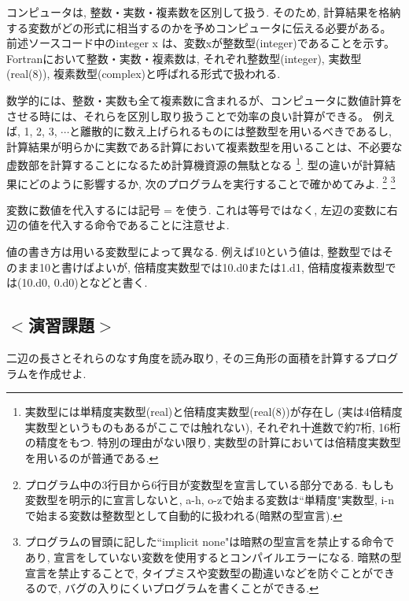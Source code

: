 \documentclass[a4j]{jsbook}
\begin{document}
コンピュータは, 整数・実数・複素数を区別して扱う.
そのため, 計算結果を格納する変数がどの形式に相当するのかを予めコンピュータに伝える必要がある。
前述ソースコード中の{\ttfamily integer x} は、変数{\ttfamily x}が整数型(integer)であることを示す。
Fortranにおいて整数・実数・複素数は, それぞれ整数型(integer), 実数型(real(8)), 複素数型(complex)と呼ばれる形式で扱われる.

数学的には、整数・実数も全て複素数に含まれるが、コンピュータに数値計算をさせる時には、それらを区別し取り扱うことで効率の良い計算ができる。
例えば, 1, 2, 3, $\cdots$と離散的に数え上げられるものには整数型を用いるべきであるし,
計算結果が明らかに実数である計算において複素数型を用いることは、不必要な虚数部を計算することになるため計算機資源の無駄となる
\footnote{実数型には単精度実数型(real)と倍精度実数型(real(8))が存在し
(実は4倍精度実数型というものもあるがここでは触れない),
それぞれ十進数で約7桁, 16桁の精度をもつ.
特別の理由がない限り, 実数型の計算においては倍精度実数型を用いるのが普通である.
}.
型の違いが計算結果にどのように影響するか, 次のプログラムを実行することで確かめてみよ.
\footnote{
  プログラム中の3行目から6行目が変数型を宣言している部分である.
  もしも変数型を明示的に宣言しないと, a-h, o-zで始まる変数は``単精度"実数型,
  i-nで始まる変数は整数型として自動的に扱われる(暗黙の型宣言).
}
\footnote{
  プログラムの冒頭に記した``implicit none"は暗黙の型宣言を禁止する命令であり,
  宣言をしていない変数を使用するとコンパイルエラーになる.
  暗黙の型宣言を禁止することで, タイプミスや変数型の勘違いなどを防ぐことができるので,
  バグの入りにくいプログラムを書くことができる.
}


変数に数値を代入するには記号$=$を使う.
これは等号ではなく, 左辺の変数に右辺の値を代入する命令であることに注意せよ.

値の書き方は用いる変数型によって異なる.
例えば10という値は, 整数型ではそのまま10と書けばよいが,
倍精度実数型では10.d0または1.d1, 倍精度複素数型では(10.d0, 0.d0)となどと書く. \\

\subsection*{$<$演習課題$>$}
二辺の長さとそれらのなす角度を読み取り, その三角形の面積を計算するプログラムを作成せよ. \\
\end{document}
